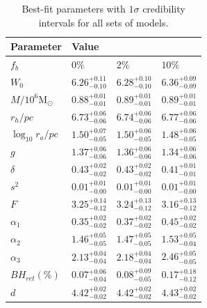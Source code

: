 

\begin{table}
	\centering
	\caption{Best-fit parameters with $1\sigma$ credibility intervals for all sets of models.}
	\begin{tabular}{l l l l}

		\hline
		Parameter                 & Value                                                                    \\
		\hline
		$f_b$                     & $0\%$                  & $2\%$                  & $10\%$                 \\
		$W_0$                     & $6.26^{+0.11}_{-0.10}$ & $6.28^{+0.10}_{-0.10}$ & $6.36^{+0.09}_{-0.09}$ \\
		$M/10^6 \mathrm{M}_\odot$ & $0.88^{+0.01}_{-0.01}$ & $0.89^{+0.01}_{-0.01}$ & $0.89^{+0.01}_{-0.01}$ \\
		$r_h / pc$                & $6.73^{+0.06}_{-0.06}$ & $6.74^{+0.06}_{-0.06}$ & $6.77^{+0.06}_{-0.06}$ \\
		$\log_{10}{r_a / pc}$     & $1.50^{+0.07}_{-0.05}$ & $1.50^{+0.06}_{-0.05}$ & $1.48^{+0.06}_{-0.05}$ \\
		$g$                       & $1.37^{+0.06}_{-0.06}$ & $1.36^{+0.06}_{-0.06}$ & $1.34^{+0.06}_{-0.06}$ \\
		$\delta$                  & $0.43^{+0.02}_{-0.02}$ & $0.43^{+0.02}_{-0.02}$ & $0.41^{+0.01}_{-0.01}$ \\
		$s^2$                     & $0.01^{+0.01}_{-0.00}$ & $0.01^{+0.01}_{-0.00}$ & $0.01^{+0.01}_{-0.00}$ \\
		$F$                       & $3.25^{+0.14}_{-0.12}$ & $3.24^{+0.13}_{-0.12}$ & $3.16^{+0.13}_{-0.12}$ \\
		$\alpha_1$                & $0.35^{+0.02}_{-0.02}$ & $0.37^{+0.02}_{-0.02}$ & $0.45^{+0.02}_{-0.02}$ \\
		$\alpha_2$                & $1.46^{+0.05}_{-0.05}$ & $1.47^{+0.05}_{-0.05}$ & $1.53^{+0.05}_{-0.04}$ \\
		$\alpha_3$                & $2.13^{+0.04}_{-0.04}$ & $2.18^{+0.04}_{-0.04}$ & $2.46^{+0.05}_{-0.05}$ \\
		$BH_{ret} (\%)$           & $0.07^{+0.06}_{-0.04}$ & $0.08^{+0.09}_{-0.05}$ & $0.17^{+0.18}_{-0.12}$ \\
		$d$                       & $4.42^{+0.02}_{-0.02}$ & $4.42^{+0.02}_{-0.02}$ & $4.43^{+0.02}_{-0.02}$ \\
		\hline
	\end{tabular}
	\label{tab:parameters_all}
\end{table}








